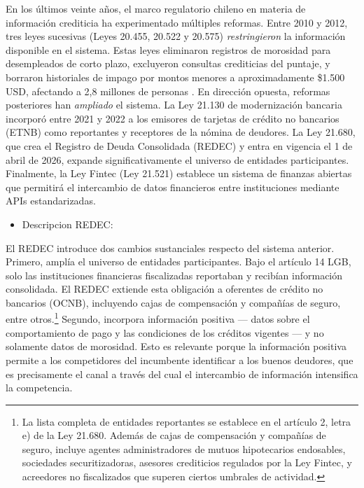 \documentclass[11pt]{article}
\theoremstyle{plain}
\theoremstyle{plain}
\begin{document}
 
En los últimos veinte años, el marco regulatorio chileno en materia de información crediticia ha experimentado múltiples reformas. Entre 2010 y 2012, tres leyes sucesivas (Leyes 20.455, 20.522 y 20.575) \textit{restringieron} la información disponible en el sistema. Estas leyes eliminaron registros de morosidad para desempleados de corto plazo, excluyeron consultas crediticias del puntaje, y borraron historiales de impago por montos menores a aproximadamente \$1.500 USD, afectando a 2,8 millones de personas \parencite{liberman_equilibrium_2018, madeira_impact_2024}. En dirección opuesta, reformas posteriores han \textit{ampliado} el sistema. La Ley 21.130 de modernización bancaria incorporó entre 2021 y 2022 a los emisores de tarjetas de crédito no bancarios (ETNB) como reportantes y receptores de la nómina de deudores. La Ley 21.680, que crea el Registro de Deuda Consolidada (REDEC) y entra en vigencia el 1 de abril de 2026, expande significativamente el universo de entidades participantes. Finalmente, la Ley Fintec (Ley 21.521) establece un sistema de finanzas abiertas que permitirá el intercambio de datos financieros entre instituciones mediante APIs estandarizadas.
\begin{itemize}
    \item Descripcion REDEC: %
\end{itemize} 


El REDEC introduce dos cambios sustanciales respecto del sistema anterior. Primero, amplía el universo de entidades participantes. Bajo el artículo 14 LGB, solo las instituciones financieras fiscalizadas reportaban y recibían información consolidada. El REDEC extiende esta obligación a oferentes de crédito no bancarios (OCNB), incluyendo cajas de compensación y compañías de seguro, entre otros.\footnote{La lista completa de entidades reportantes se establece en el artículo 2, letra e) de la Ley 21.680. Además de cajas de compensación y compañías de seguro, incluye agentes administradores de mutuos hipotecarios endosables, sociedades securitizadoras, asesores crediticios regulados por la Ley Fintec, y acreedores no fiscalizados que superen ciertos umbrales de actividad.} Segundo, incorpora información positiva --- datos sobre el comportamiento de pago y las condiciones de los créditos vigentes --- y no solamente datos de morosidad. Esto es relevante porque la información positiva permite a los competidores del incumbente identificar a los buenos deudores, que es precisamente el canal a través del cual el intercambio de información intensifica la competencia.
\end{document}
